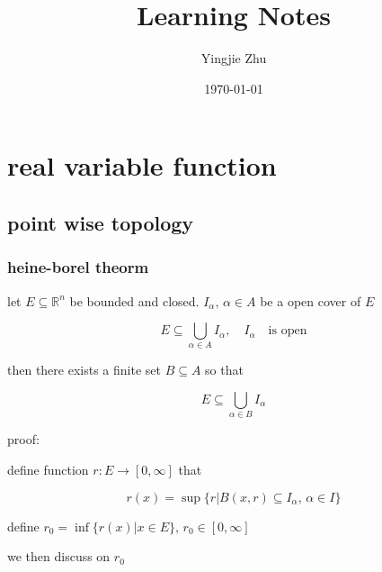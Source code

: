 \documentclass[11pt,a4paper]{article}
\title{Learning Notes}
\author{Yingjie Zhu}
\date{\today}
\begin{document}
\maketitle
\tableofcontents

\section{real variable function}

\subsection{point wise topology}

\subsubsection{heine-borel theorm}

let $E \subseteq \mathbb{R}^n$ be bounded and closed. $I_{\alpha},\, \alpha \in A$ be a open cover of $E$

\[
    E \subseteq \bigcup_{\alpha \in A}I_{\alpha},\quad I_{\alpha} \quad \text{is open}
\]

then there exists a finite set $B \subseteq A$ so that

\[
E \subseteq \bigcup_{\alpha \in B}I_{\alpha}
\]

proof:

define function $r: E \to [0, \infty]$ that

\[
r(x) = \sup \{ r \vert B(x,r) \subseteq I_{\alpha},\, \alpha \in I \}
\]

define $r_0 = \inf \{ r(x) \vert x \in E  \},\, r_0 \in [0,\infty]$

we then discuss on $r_0$
\end{document}
